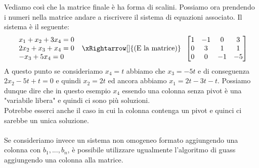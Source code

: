 \hspace{-15pt}Vediamo così che la matrice finale è ha forma di scalini. Possiamo ora prendendo i numeri nella matrice andare a riscrivere il sistema di equazioni associato. Il sistema è il seguente:
\[
\begin{array}{l}
x_1 + x_2 + 3x_4 = 0\\
2x_2 + x_3 + x_4 = 0\\
-x_3 + 5x_4 = 0
\end{array}
\hspace{.2cm}
\xRightarrow[]{\text{(E la matrice)}}
\hspace{.2cm}
\begin{bmatrix}
1 & -1 & 0 & 3\\
0 & 3 & 1 & 1\\
0 & 0 & -1 & -5
\end{bmatrix}
\]
A questo punto se consideriamo $x_4 = t$ abbiamo che $x_3 = -5t$ e di conseguenza $2x_2 - 5t + t = 0$ e quindi $x_2 = 2t$ ed ancora abbiamo $x_1 = 2t -3t -t$. Possiamo dunque dire che in questo esempio $x_4$ essendo una colonna senza pivot è una "variabile libera" e quindi ci sono più soluzioni.\\
Potrebbe esserci anche il caso in cui la colonna contenga un pivot e quinci ci sarebbe un unica soluzione.\\\\
Se consideriamo invece un sistema non omogeneo formato aggiungendo una colonna con $b_1, ..., b_n$, è possibile utilizzare ugualmente l'algoritmo di guass aggiungendo una colonna alla matrice.

